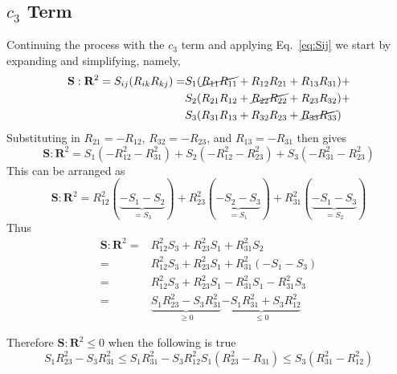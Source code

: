\newcommand{\term}{\mathbf{S}:\mathbf{R}^2}
\subsection{$c_{3}$ Term}
Continuing the process with the $c_{3}$ term and applying Eq.~\ref{eq:Sij}
we start by expanding and simplifying, namely,
\begin{equation}
    \begin{split}
        \mathbf{S}:\mathbf{R}^2 =  S_{ij}(R_{ik}R_{kj}) = &  
                S_{1}(\cancel{R_{11} R_{11}} + R_{12} R_{21} + R_{13} R_{31}) +     \\
            &   S_{2}(R_{21} R_{12} + \cancel{R_{22} R_{22}} + R_{23} R_{32}) +     \\
            &   S_{3}(R_{31} R_{13} + R_{32} R_{23} + \cancel{R_{33} R_{33}})
    \end{split}
\end{equation}
Substituting in $R_{21} = -R_{12}$, $R_{32} = -R_{23}$, and $R_{13} = -
R_{31}$ then gives
\begin{equation}
        \term = 
        S_{1} (-R_{12}^2 - R_{31}^2)  +
        S_{2} (-R_{12}^2 - R_{23}^2)  +
        S_{3} (-R_{31}^2 - R_{23}^2)
\end{equation}
This can be arranged as
\begin{equation}
        \term = 
        R_{12}^{2} (\underbrace{-S_{1} - S_{2}}_{= S_{3}}) + 
        R_{23}^{2} (\underbrace{-S_{2} - S_{3}}_{= S_{1}}) + 
        R_{31}^{2} (\underbrace{-S_{1} - S_{3}}_{= S_{2}})  
\end{equation}
Thus
\begin{subequations}
    \begin{align}
        \term = & 
            R_{12}^2 S_{3} + R_{23}^2 S_{1} + R_{31}^2 S_{2}                  \\
         = & R_{12}^2 S_{3} + R_{23}^2 S_{1} + R_{31}^2 (-S_{1} - S_{3})       \\
         = & R_{12}^2 S_{3} + R_{23}^2 S_{1} - R_{31}^2 S_{1} - R_{31}^2 S_{3} \\ 
         = & \underbrace{S_{1} R_{23}^2 - S_{3} R_{31}^{2}}_{\geq 0}          
                \underbrace{-S_{1} R_{31}^2 + S_{3} R_{12}^2}_{\leq 0}
    \end{align}
\end{subequations}

Therefore $\mathbf{S}:\mathbf{R}^2 \leq 0$ when the following is true
\begin{subequations}
    \begin{equation}
        S_{1} R_{23}^2 - S_{3} R_{31}^2 \leq S_{1} R_{31}^2 - S_{3} R_{12}^2
    \end{equation}
    \begin{equation}
        S_{1} (R_{23}^2 - R_{31}) \leq S_{3} ( R_{31}^2 - R_{12}^2)
    \end{equation}
    \label{eq:c3-inequal}
\end{subequations}     \\

